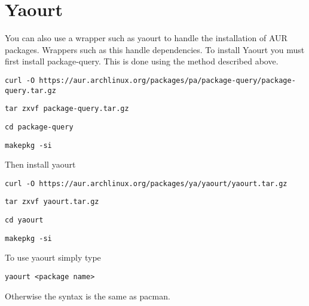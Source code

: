 \documentclass[12pt]{article}
\begin{document}
  \section*{Yaourt}
    You can also use a wrapper such as yaourt to handle the installation of AUR
    packages. Wrappers such as this handle dependencies.
    To install Yaourt you must first install package-query. This is done using
    the method described above.

    \begin{verbatim}curl -O https://aur.archlinux.org/packages/pa/package-query/package-query.tar.gz\end{verbatim}
    \begin{verbatim}tar zxvf package-query.tar.gz\end{verbatim}
    \begin{verbatim}cd package-query\end{verbatim}
    \begin{verbatim}makepkg -si\end{verbatim}

    Then install yaourt
    \begin{verbatim}curl -O https://aur.archlinux.org/packages/ya/yaourt/yaourt.tar.gz\end{verbatim}
    \begin{verbatim}tar zxvf yaourt.tar.gz\end{verbatim}
    \begin{verbatim}cd yaourt\end{verbatim}
    \begin{verbatim}makepkg -si \end{verbatim}

    To use yaourt simply type
    \begin{verbatim}yaourt <package name>\end{verbatim}
    Otherwise the syntax is the same as pacman.
\end{document}
